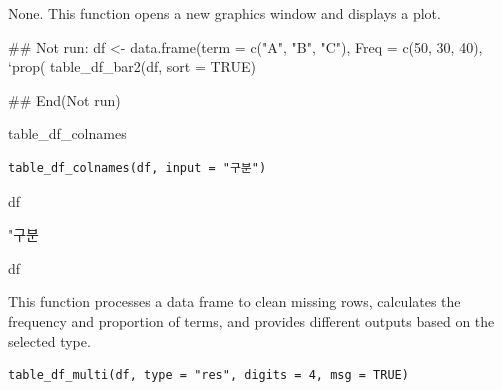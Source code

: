\documentclass[a4paper]{book}
\begin{document}
%
\begin{Value}
None. This function opens a new graphics window and displays a plot.
\end{Value}
%
\begin{Examples}
\begin{ExampleCode}
## Not run: 
df <- data.frame(term = c("A", "B", "C"),
                 Freq = c(50, 30, 40),
                 `prop(%
table_df_bar2(df, sort = TRUE)

## End(Not run)

\end{ExampleCode}
\end{Examples}
%
\begin{Description}
table\_df\_colnames
\end{Description}
%
\begin{Usage}
\begin{verbatim}
table_df_colnames(df, input = "구분")
\end{verbatim}
\end{Usage}
%
\begin{Arguments}
\begin{ldescription}
\item[\code{df}] df

\item[\code{input}] "구분
\end{ldescription}
\end{Arguments}
%
\begin{Value}
df
\end{Value}
%
\begin{Description}
This function processes a data frame to clean missing rows, calculates the frequency
and proportion of terms, and provides different outputs based on the selected type.
\end{Description}
%
\begin{Usage}
\begin{verbatim}
table_df_multi(df, type = "res", digits = 4, msg = TRUE)
\end{verbatim}
\end{Usage}
%
\end{document}
